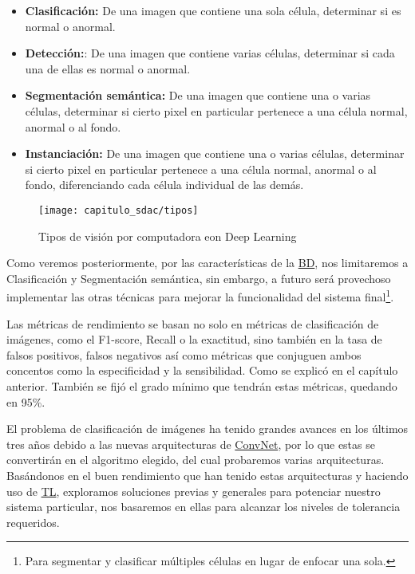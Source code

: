 \begin{itemize}
    \item{\textbf{Clasificación:}} De una imagen que contiene una sola célula,
    determinar si es normal o anormal.
    \item{\textbf{Detección:}}: De una imagen que contiene varias células,
    determinar si cada una de ellas es normal o anormal.
    \item{\textbf{Segmentación semántica:}} De una imagen que contiene una o
    varias células, determinar si cierto pixel en particular pertenece a una
    célula normal, anormal o al fondo.
    \item{\textbf{Instanciación:}} De una imagen que contiene una o varias
    células, determinar si cierto pixel en particular pertenece a una célula
    normal, anormal o al fondo, diferenciando cada célula individual de las
    demás. 
\end{itemize}

\begin{figure}[H]
  \centering
  \texttt{[image: capitulo\_sdac/tipos]}
  \caption{Tipos de visión por computadora eon Deep Learning}\label{fig:tipos}
\end{figure}


Como veremos posteriormente, por las características de la \hyperlink{abbr}{BD},
nos limitaremos a Clasificación y Segmentación semántica, sin embargo, a futuro
será provechoso implementar las otras técnicas para mejorar la funcionalidad del
sistema final\footnote{Para segmentar y clasificar múltiples células en lugar de
enfocar una sola.}.

Las métricas de rendimiento se basan no solo en métricas de clasificación de
imágenes, como el F1-score, Recall o la exactitud, sino también en la tasa de
falsos positivos, falsos negativos así como métricas que conjuguen ambos
concentos como la especificidad y la sensibilidad. Como se explicó en el
capítulo anterior. También se fijó el grado mínimo que tendrán estas métricas,
quedando en 95\%.

El problema de clasificación de imágenes ha tenido grandes avances en los
últimos tres años debido a las nuevas arquitecturas de
\hyperlink{abbr}{ConvNet}, por lo que estas se convertirán en el algoritmo
elegido, del cual probaremos varias arquitecturas. Basándonos en el buen
rendimiento que han tenido estas arquitecturas y haciendo uso de
\hyperlink{abbr}{TL}, exploramos soluciones previas y generales para potenciar
nuestro sistema particular, nos basaremos en ellas para alcanzar los niveles de
tolerancia requeridos.

